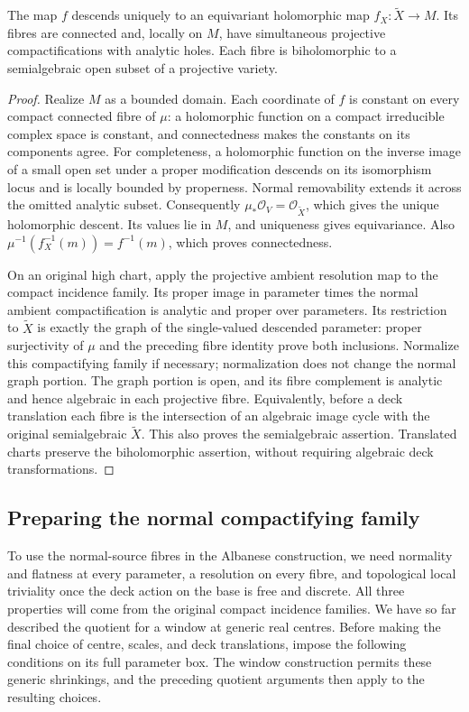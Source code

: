 \begin{lemma}\label{quo:descent}
The map \(f\) descends uniquely to an equivariant holomorphic
map \(f_X:\widetilde X\to M\). Its fibres are connected and,
locally on \(M\), have simultaneous projective compactifications
with analytic holes. Each fibre is biholomorphic to a semialgebraic
open subset of a projective variety.
\end{lemma}
\begin{proof}
Realize \(M\) as a bounded domain. Each coordinate of \(f\)
is constant on every compact connected fibre of \(\mu\): a
holomorphic function on a compact irreducible complex space is
constant, and connectedness makes the constants on its components
agree. For completeness, a holomorphic function on the inverse image
of a small open set under a proper modification descends on its
isomorphism locus and is locally bounded by properness. Normal
removability extends it across the omitted analytic subset.
Consequently \(\mu_*\mathcal O_V=\mathcal O_{\widetilde X}\),
which gives the unique holomorphic descent. Its values lie in \(M\), and uniqueness
gives equivariance. Also
\(\mu^{-1}(f_X^{-1}(m))=f^{-1}(m)\), which proves connectedness.

On an original high chart, apply the projective ambient resolution
map to the compact incidence family. Its proper image in parameter
times the normal ambient compactification is analytic and proper
over parameters. Its restriction to \(\widetilde X\) is exactly
the graph of the single-valued descended parameter: proper
surjectivity of \(\mu\) and the preceding fibre identity prove
both inclusions. Normalize this compactifying family if necessary;
normalization does not change the normal graph portion. The graph
portion is open, and its fibre complement is analytic and hence
algebraic in each projective fibre. Equivalently, before a deck
translation each fibre is the intersection of an algebraic image
cycle with the original semialgebraic \(\widetilde X\). This also
proves the semialgebraic assertion. Translated charts preserve
the biholomorphic assertion, without requiring algebraic deck
transformations.
\end{proof}

\subsection{Preparing the normal compactifying family}

To use the normal-source fibres in the Albanese construction, we
need normality and flatness at every parameter, a resolution on
every fibre, and topological local triviality once the deck action
on the base is free and discrete. All three properties will come
from the original compact incidence families. We have so far
described the quotient for a window at generic real centres.
Before making the final choice of centre, scales, and deck
translations, impose the following conditions on its full
parameter box. The window construction permits these generic
shrinkings, and the preceding quotient arguments then apply to
the resulting choices.

